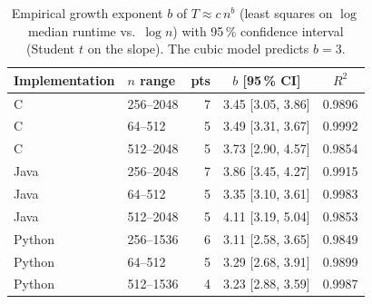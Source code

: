 \begin{table}[t]
\centering
\caption{Empirical growth exponent $b$ of $T \approx c\,n^b$ (least squares on $\log$ median runtime vs.\ $\log n$) with 95\,\% confidence interval (Student $t$ on the slope). The cubic model predicts $b=3$.}
\label{tab:growth}
\small
\begin{tabular}{@{}llrcc@{}}
\toprule
Implementation & $n$ range & pts & $b$ [95\,\% CI] & $R^2$ \\
\midrule
C & 256--2048 & 7 & 3.45 [3.05, 3.86] & 0.9896 \\
C & 64--512 & 5 & 3.49 [3.31, 3.67] & 0.9992 \\
C & 512--2048 & 5 & 3.73 [2.90, 4.57] & 0.9854 \\
Java & 256--2048 & 7 & 3.86 [3.45, 4.27] & 0.9915 \\
Java & 64--512 & 5 & 3.35 [3.10, 3.61] & 0.9983 \\
Java & 512--2048 & 5 & 4.11 [3.19, 5.04] & 0.9853 \\
Python & 256--1536 & 6 & 3.11 [2.58, 3.65] & 0.9849 \\
Python & 64--512 & 5 & 3.29 [2.68, 3.91] & 0.9899 \\
Python & 512--1536 & 4 & 3.23 [2.88, 3.59] & 0.9987 \\
\bottomrule
\end{tabular}
\end{table}
